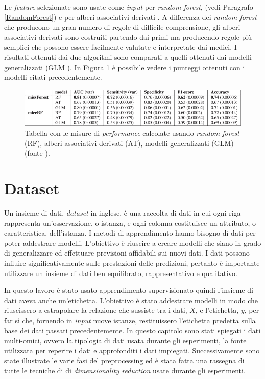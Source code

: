 \documentclass[12pt,italian]{report}
\begin{document}
	Le \textit{feature} selezionate sono usate come \textit{input} per \textit{random forest}, (vedi Paragrafo \ref{RandomForest}) e per alberi associativi derivati \cite{e1bb70540db14ceeacddd4383fca9bff}. A differenza dei \textit{random forest} che producono un gran numero di regole di difficile comprensione, gli alberi associativi derivati sono costruiti partendo dai primi ma producendo regole più semplici che possono essere facilmente valutate e interpretate dai medici.
	I risultati ottenuti dai due algoritmi sono comparati a quelli ottenuti dai modelli generalizzati (GLM \cite{10.2307/2344614}). In Figura \ref{fig:resultcovidmodel} è possibile vedere i punteggi ottenuti con i modelli citati precedentemente.
	
	\begin{figure}[t]
		\centering
		\includegraphics[width=1\linewidth]{immagini/resultCovidModels.jpg}
		\caption{Tabella con le misure di \textit{performance} calcolate usando \textit{random forest} (RF), alberi associativi derivati (AT), modelli generalizzati (GLM) (fonte \cite{Casiraghi2020-zt}).}
		\label{fig:resultcovidmodel}
	\end{figure}
	
	
	\chapter{Dataset}
	\label{Dataset}
	Un insieme di dati, \textit{dataset} in inglese, è una raccolta di dati in cui ogni riga rappresenta un'osservazione, o istanza, e ogni colonna costituisce un attributo, o caratteristica, dell'istanza. I metodi di apprendimento hanno bisogno di dati per poter addestrare modelli. L'obiettivo è riuscire a creare modelli che siano in grado di generalizzare ed effettuare previsioni affidabili sui nuovi dati. I dati possono influire significativamente sulle prestazioni delle predizioni, pertanto è importante utilizzare un insieme di dati ben equilibrato, rappresentativo e qualitativo.
	
	In questo lavoro è stato usato apprendimento supervisionato quindi l'insieme di dati aveva anche un'etichetta. L'obiettivo è stato addestrare modelli in modo che riuscissero a estrapolare la relazione che sussiste tra i dati, $X$, e l'etichetta, $y$, per far sì che, fornendo in \textit{input} nuove istanze, restituissero l'etichetta predetta sulla base dei dati passati precedentemente. 
	In questo capitolo sono stati spiegati i dati multi-omici, ovvero la tipologia di dati usata durante gli esperimenti, la fonte utilizzata per reperire i dati e approfonditi i dati impiegati. Successivamente sono state illustrate le varie fasi del preprocessing ed è stata fatta una rassegna di tutte le tecniche di di \textit{dimensionality reduction} usate durante gli esperimenti.
	
\end{document}

